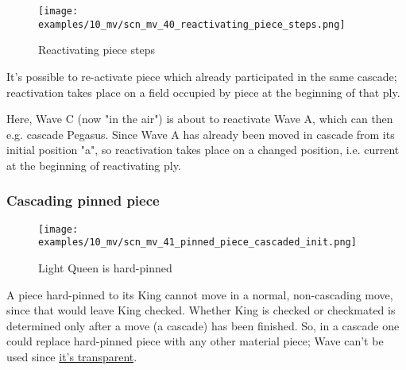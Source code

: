 \clearpage %

\vspace*{-2.1\baselineskip}
\noindent
\begin{figure}[!h]
\texttt{[image: examples/10\_mv/scn\_mv\_40\_reactivating\_piece\_steps.png]}
\vspace*{-1.3\baselineskip}
\caption{Reactivating piece steps}
\label{fig:scn_mv_40_reactivating_piece_steps}
\end{figure}

\vspace*{-0.3\baselineskip}
It's possible to re-activate piece which already participated in the same cascade;
reactivation takes place on a field occupied by piece at the beginning of that ply.

Here, Wave C (now "in the air") is about to reactivate Wave A, which can then e.g.
cascade Pegasus. Since Wave A has already been moved in cascade from its initial
position "a", so reactivation takes place on a changed position, i.e. current at
the beginning of reactivating ply.

\clearpage %

\subsubsection*{Cascading pinned piece}
\label{sec:Miranda's veil/Wave/Cascading Waves/Cascading pinned piece}

\vspace*{-1.5\baselineskip}
\noindent
\begin{figure}[!h]
\texttt{[image: examples/10\_mv/scn\_mv\_41\_pinned\_piece\_cascaded\_init.png]}
\vspace*{-1.3\baselineskip}
\caption{Light Queen is hard-pinned}
\label{fig:scn_mv_41_pinned_piece_cascaded_init}
\end{figure}

\vspace*{-0.5\baselineskip}
A piece hard-pinned to its King cannot move in a normal, non-cascading move, since
that would leave King checked. Whether King is checked or checkmated is determined
only after a move (a cascade) has been finished. So, in a cascade one could replace
hard-pinned piece with any other material piece; Wave can't be used since
\hyperref[fig:scn_mv_07_wave_is_transparent]{it's transparent}.

